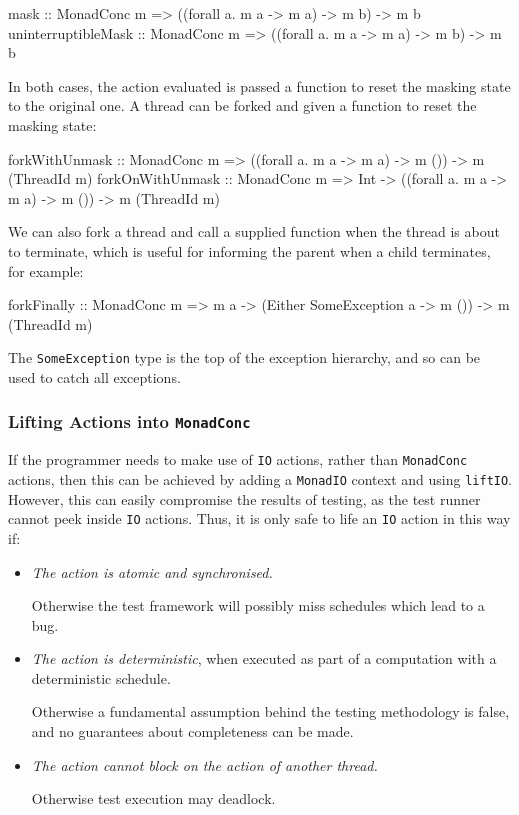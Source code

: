 \begin{haskellcode}
mask :: MonadConc m => ((forall a. m a -> m a) -> m b) -> m b
uninterruptibleMask :: MonadConc m => ((forall a. m a -> m a) -> m b) -> m b
\end{haskellcode}

In both cases, the action evaluated is passed a function to reset the
masking state to the original one. A thread can be forked and given a
function to reset the masking state:

\begin{haskellcode}
forkWithUnmask :: MonadConc m => ((forall a. m a -> m a) -> m ())
  -> m (ThreadId m)
forkOnWithUnmask :: MonadConc m => Int -> ((forall a. m a -> m a) -> m ())
  -> m (ThreadId m)
\end{haskellcode}

We can also fork a thread and call a supplied function when the thread
is about to terminate, which is useful for informing the parent when a
child terminates, for example:

\begin{haskellcode}
forkFinally :: MonadConc m => m a -> (Either SomeException a -> m ())
  -> m (ThreadId m)
\end{haskellcode}

The \verb|SomeException| type is the top of the exception hierarchy,
and so can be used to catch all exceptions.

\subsubsection{Lifting Actions into \texttt{MonadConc}}
\label{sec:abstraction-typeclass-lifting}

If the programmer needs to make use of \verb|IO| actions, rather than
\verb|MonadConc| actions, then this can be achieved by adding a
\verb|MonadIO| context and using \verb|liftIO|. However, this can
easily compromise the results of testing, as the test runner cannot
peek inside \verb|IO| actions. Thus, it is only safe to life an
\verb|IO| action in this way if:

\begin{itemize}
\item \emph{The action is atomic and synchronised.}

  Otherwise the test framework will possibly miss schedules which lead
  to a bug.

\item \emph{The action is deterministic}, when executed as part of a
  computation with a deterministic schedule.

  Otherwise a fundamental assumption behind the testing methodology
  is false, and no guarantees about completeness can be made.

\item \emph{The action cannot block on the action of another thread.}

  Otherwise test execution may deadlock.
\end{itemize}

